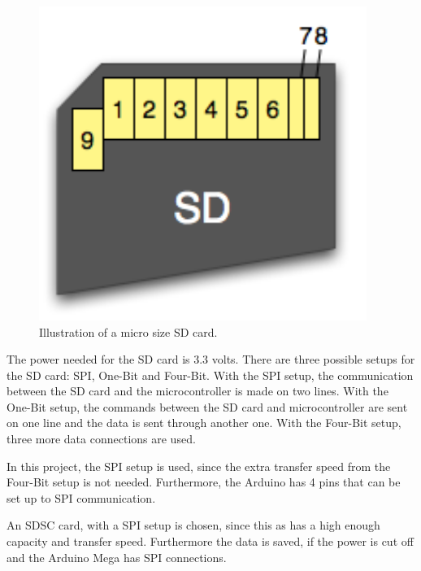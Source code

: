 \begin{minipage}{\linewidth}
\begin{minipage}{0.30\linewidth}
\begin{figure}[H]
              \includegraphics[width=0.95\textwidth]{figures/sdcardpinout}
              \caption{Illustration of a micro size SD card.} 
              \label{SDcardpinout}
          \end{figure}
      \end{minipage}
      
  \end{minipage}


The power needed for the SD card is 3.3 volts. There are three possible setups for the SD card: SPI, One-Bit and Four-Bit.
With the SPI setup, the communication between the SD card and the microcontroller is made on two lines. With the One-Bit setup, the commands between the SD card and microcontroller are sent on one line and the data is sent through another one.
With the Four-Bit setup, three more data connections are used.

In this project, the SPI setup is used, since the extra transfer speed from the Four-Bit setup is not needed. Furthermore, the Arduino has 4 pins that can be set up to SPI communication.

An SDSC card, with a SPI setup is chosen, since this as has a high enough capacity and transfer speed. Furthermore the data is saved, if the power is cut off and the Arduino Mega has SPI connections. 

